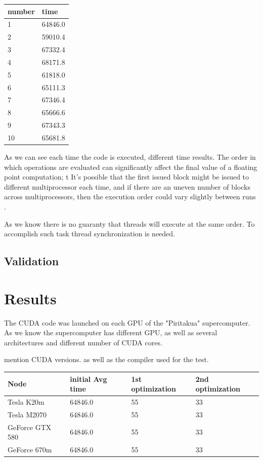 \begin{table}[h]
\centering
  \begin{tabular} { |  l  |  l  |  }
    \hline
    number & time  \\
    \hline
    1 &  64846.0 \\
   \hline
    2 & 59010.4 \\
   \hline
    3 & 67332.4\\
   \hline
    4 & 68171.8 \\
   \hline
    5 & 61818.0 \\
   \hline
    6 & 65111.3\\
    \hline
    7 &  67346.4\\
    \hline
    8 & 65666.6 \\
    \hline
    9 & 67343.3 \\
    \hline
    10 & 65681.8      \\
   \hline
  \end{tabular}
  \end{table}
  
As we can see each time the code is executed, different time results. The order in which operations are evaluated can significantly affect the final value of a floating point computation; t
It's possible that the first issued block might be issued to different multiprocessor each time, and if there are an uneven number of blocks across multiprocessors, then the execution order could vary slightly between runs \cite{cook}.

As we know there is no guaranty that threads will execute at the same order. To accomplish such task thread synchronization is needed.

\subsection{Validation}



\section{Results}

The CUDA code was launched on each GPU of the "Piritakua" supercomputer. As we know the supercomputer has different GPU, as well as several architectures and different number of CUDA cores.


mention CUDA versions. as well as the compiler used for the test.


\begin{table}[h]
\centering
  \begin{tabular} { |  l  |  l  |  l  | l |}
    \hline
    Node & initial Avg time & 1st optimization & 2nd optimization \\
    \hline
    Tesla K20m &  64846.0 & 55 & 33\\
   \hline
    Tesla M2070 & 64846.0 & 55 & 33\\
   \hline
    GeForce GTX 580 & 64846.0 & 55 & 33\\
   \hline
    GeForce 670m & 64846.0 & 55 & 33\\
   \hline
  \end{tabular}
  \end{table}
  
